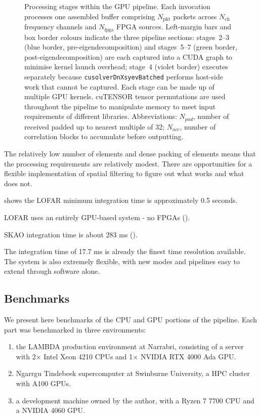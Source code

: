 \documentclass{pas}
\begin{document}
\begin{figure}[!htbp]
\begin{tikzpicture}[node distance=3mm]
  \end{tikzpicture}
  \caption{%
    Processing stages within the GPU pipeline. Each invocation
    processes one assembled buffer comprising $N_\mathrm{pkt}$ packets
    across $N_\mathrm{ch}$ frequency channels and $N_\mathrm{fpga}$ FPGA
    sources.  Left-margin bars and box border colours indicate the three
    pipeline sections: stages~2--3 (\textcolor{blue!60!black}{blue} border,
    pre-eigendecomposition) and stages~5--7
    (\textcolor{green!50!black}{green} border, post-eigendecomposition) are
    each captured into a CUDA graph to minimise kernel launch overhead;
    stage~4 (\textcolor{cSolve!80!black}{violet} border) executes separately
    because \texttt{cusolverDnXsyevBatched} performs host-side work
    that cannot be captured. Each stage can be made up of multiple GPU kernels. 
    cuTENSOR tensor permutations are used throughout
    the pipeline to manipulate memory to meet input requirements of different 
    libraries.
    Abbreviations: $N_{pad}$, number of received padded up to nearest multiple of 32; 
    $N_{acc}$, number of correlation blocks to accumulate before outputting.
  }
  \label{fig:gpu-pipeline}
  \end{figure}

The relatively low number of elements and dense packing of elements means that
the processing requirements are relatively modest. There are opportunities for
a flexible implementation of spatial filtering to figure out what works and
what does not.

\cite{astron_lofar_2026} shows the LOFAR minimum integration time is
approximately 0.5 seconds.

LOFAR uses an entirely GPU-based system - no FPGAs
(\cite{broekema_cobalt_2018}).

SKAO integration time is about 283 ms (\cite{skao_low_2026}).

The integration time of 17.7 ms is already the finest time resolution
available. The system is also extremely flexible, with new modes and pipelines
easy to extend through software alone.

\subsection{Benchmarks}
We present here benchmarks of the CPU and GPU portions of the pipeline. 
Each part was benchmarked in three environments: 
\begin{enumerate}
\item the LAMBDA production environment at Narrabri, consisting of a server with 2$\times$ Intel Xeon 4210 CPUs and 1$\times$ NVIDIA RTX 4000 Ada GPU. 
\item Ngarrgu Tindebeek supercomputer at Swinburne University, a HPC cluster with A100 GPUs.
\item a development machine owned by the author, with a Ryzen 7 7700 CPU and a NVIDIA 4060 GPU.
\end{enumerate}
\end{document}
